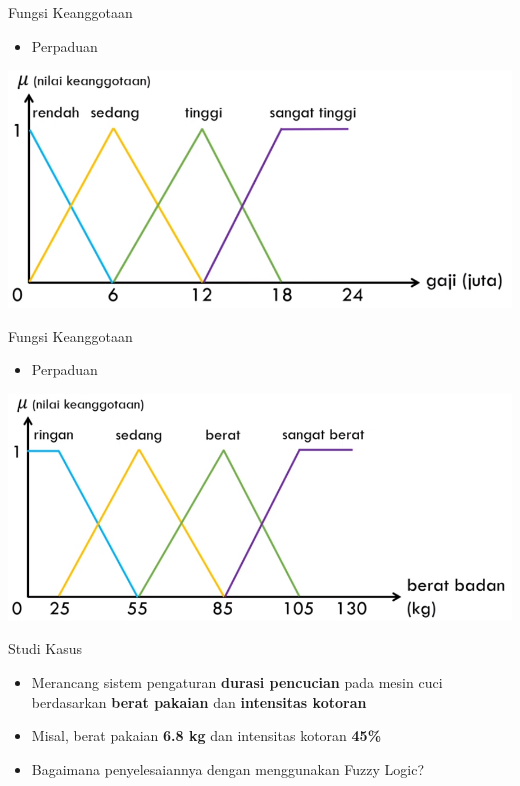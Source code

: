 \documentclass[pdflatex,compress,mathserif]{beamer}
\begin{document}
\begin{frame}{Fungsi Keanggotaan}
	\begin{itemize}
		\item Perpaduan
	\end{itemize}
	\begin{center}
		\includegraphics[width=0.7\linewidth]{img/20}
	\end{center}
\end{frame}

\begin{frame}{Fungsi Keanggotaan}
	\begin{itemize}
		\item Perpaduan
	\end{itemize}
	\begin{center}
		\includegraphics[width=0.7\linewidth]{img/21}
	\end{center}
\end{frame}

\begin{frame}{Studi Kasus}
	\begin{itemize}
		\item Merancang sistem pengaturan \textbf{durasi pencucian} pada mesin cuci berdasarkan \textbf{berat pakaian} dan \textbf{intensitas kotoran}
		\item Misal, berat pakaian \textbf{6.8 kg} dan intensitas kotoran \textbf{45\%}
		\item Bagaimana penyelesaiannya dengan menggunakan Fuzzy Logic?
	\end{itemize}
\end{frame}
\end{document}
